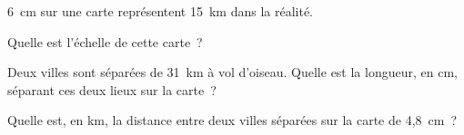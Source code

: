  6~cm sur une carte représentent 15~km dans la réalité.
\begin{myenumerate}
\item Quelle est l'échelle de cette carte ?
\item Deux villes sont séparées de 31~km à vol d'oiseau. Quelle est la
longueur, en cm, séparant ces deux lieux sur la carte ?
\item Quelle est, en km, la distance entre deux villes séparées sur la
carte de 4,8~cm ?
 \end{myenumerate}